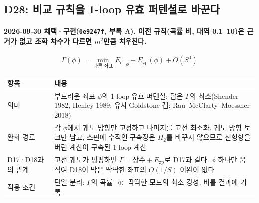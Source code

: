 \subsection{D28: 비교 규칙을 1-loop 유효 퍼텐셜로 바꾼다}\label{d28-principle}
\begingroup%
  \framesubtitle{2026-09-30 채택·구현(\texttt{0e9247f}, 부록 A). 이전 규칙(곡률 비, 대역 0.1--10)은 근거가 없고 조화 차수가 다르면 $m^2$만큼 치우친다.}
  \small
  \[
    \Gamma(\phi)=\min_{\text{다른 좌표}}E_{\mathrm{cl}}\big|_{\phi}+E_{\mathrm{zp}}(\phi)+O(S^0)
  \]
  \begin{tabularx}{\textwidth}{@{}P{2.6cm}Y@{}}
    \toprule
    항목 & 내용 \\
    \midrule
    의미 & 부드러운 좌표 $\phi$의 1-loop 유효 퍼텐셜; 답은 $\Gamma$의 최소(Shender 1982, Henley 1989; 유사 Goldstone 갭: Rau--McClarty--Moessner 2018) \\
    완화 경로 & 각 $\phi$에서 궤도 방향만 고정하고 나머지를 고전 최소화. 궤도 방향 토크만 남고, 스핀에 수직인 구속장은 $H_2$를 바꾸지 않으므로 선형항을 버린 계산이 구속된 1-loop 계산 \\
    D17·D18과의 관계 & 고전 궤도가 평평하면 $\Gamma=\text{상수}+E_{\mathrm{zp}}$로 D17과 같다. $\phi$ 하나만 움직여 D18이 막은 딱딱한 좌표의 $O(1/S)$ 이완이 없다 \\
    적용 조건 & 단열 분리: $\Gamma$의 곡률 $\ll$ 딱딱한 모드의 최소 강성. 비를 결과에 기록 \\
    \bottomrule
  \end{tabularx}
  \par\medskip
\endgroup


